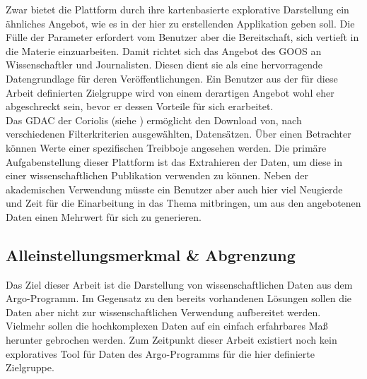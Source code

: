 Zwar bietet die Plattform durch ihre kartenbasierte explorative Darstellung ein ähnliches Angebot, wie es in der hier zu erstellenden Applikation geben soll. Die Fülle der Parameter erfordert vom Benutzer aber die Bereitschaft, sich vertieft in die Materie einzuarbeiten. Damit richtet sich das Angebot des \gls{GOOS} an Wissenschaftler und Journalisten. Diesen dient sie als eine hervorragende Datengrundlage für deren Veröffentlichungen. Ein Benutzer aus der für diese Arbeit definierten Zielgruppe wird von einem derartigen Angebot wohl eher abgeschreckt sein, bevor er dessen Vorteile für sich erarbeitet.
\\

Das \gls{GDAC} der Coriolis (siehe \cite{ArgoDataSelection}) ermöglicht den Download von, nach verschiedenen Filterkriterien ausgewählten, Datensätzen. Über einen Betrachter können Werte einer spezifischen Treibboje angesehen werden.
Die primäre Aufgabenstellung dieser Plattform ist das Extrahieren der Daten, um diese in einer wissenschaftlichen Publikation verwenden zu können. Neben der akademischen Verwendung müsste ein Benutzer aber auch hier viel Neugierde und Zeit für die Einarbeitung in das Thema mitbringen, um aus den angebotenen Daten einen Mehrwert für sich zu generieren.


\subsection{Alleinstellungsmerkmal \& Abgrenzung}

Das Ziel dieser Arbeit ist die Darstellung von wissenschaftlichen Daten aus dem Argo-Programm. Im Gegensatz zu den bereits vorhandenen Lösungen sollen die Daten aber nicht zur wissenschaftlichen Verwendung aufbereitet werden. Vielmehr sollen die hochkomplexen Daten auf ein einfach erfahrbares Maß herunter gebrochen werden. Zum Zeitpunkt dieser Arbeit existiert noch kein exploratives Tool für Daten des Argo-Programms für die hier definierte Zielgruppe.
